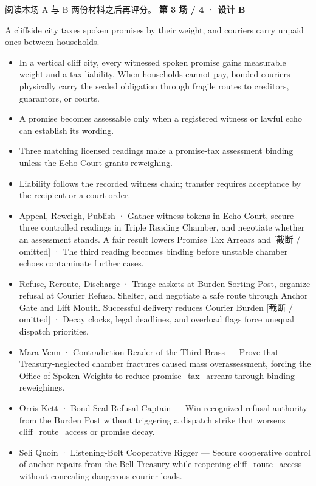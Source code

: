 \documentclass[10pt,a4paper]{article}
\newcommand{\heading}[1]{\par\vspace{5pt}{\color{teal}\bfseries #1}\par}
\begin{document}
\vfill\small 阅读本场 A 与 B 两份材料之后再评分。
\clearpage
{\Large\bfseries 第 3 场 / 4 · 设计 B}\par
\heading{共同生成要求}
{\small A cliffside city taxes spoken promises by their weight, and couriers carry unpaid ones between households.}\par\vspace{6pt}
\begin{minipage}[t]{0.48\linewidth}\fontsize{9}{12}\selectfont\raggedright\setlength{\parskip}{0pt}
\heading{世界概述}\begin{itemize}
\item In a vertical cliff city, every witnessed spoken promise gains measurable weight and a tax liability. When households cannot pay, bonded couriers physically carry the sealed obligation through fragile routes to creditors, guarantors, or courts.
\end{itemize}
\heading{规则与制度}\begin{itemize}
\item A promise becomes assessable only when a registered witness or lawful echo can establish its wording.
\item Three matching licensed readings make a promise-tax assessment binding unless the Echo Court grants reweighing.
\item Liability follows the recorded witness chain; transfer requires acceptance by the recipient or a court order.
\end{itemize}
\heading{活动与压力}\begin{itemize}
\item Appeal, Reweigh, Publish · Gather witness tokens in Echo Court, secure three controlled readings in Triple Reading Chamber, and negotiate whether an assessment stands. A fair result lowers Promise Tax Arrears and [截断 / omitted] · The third reading becomes binding before unstable chamber echoes contaminate further cases.
\item Refuse, Reroute, Discharge · Triage caskets at Burden Sorting Post, organize refusal at Courier Refusal Shelter, and negotiate a safe route through Anchor Gate and Lift Mouth. Successful delivery reduces Courier Burden [截断 / omitted] · Decay clocks, legal deadlines, and overload flags force unequal dispatch priorities.
\end{itemize}
\heading{人物与目标}\begin{itemize}
\item Mara Venn · Contradiction Reader of the Third Brass — Prove that Treasury-neglected chamber fractures caused mass overassessment, forcing the Office of Spoken Weights to reduce promise\_tax\_arrears through binding reweighings.
\item Orris Kett · Bond-Seal Refusal Captain — Win recognized refusal authority from the Burden Post without triggering a dispatch strike that worsens cliff\_route\_access or promise decay.
\item Seli Quoin · Listening-Bolt Cooperative Rigger — Secure cooperative control of anchor repairs from the Bell Treasury while reopening cliff\_route\_access without concealing dangerous courier loads.
\end{itemize}
\end{minipage}\hfill
\end{document}
